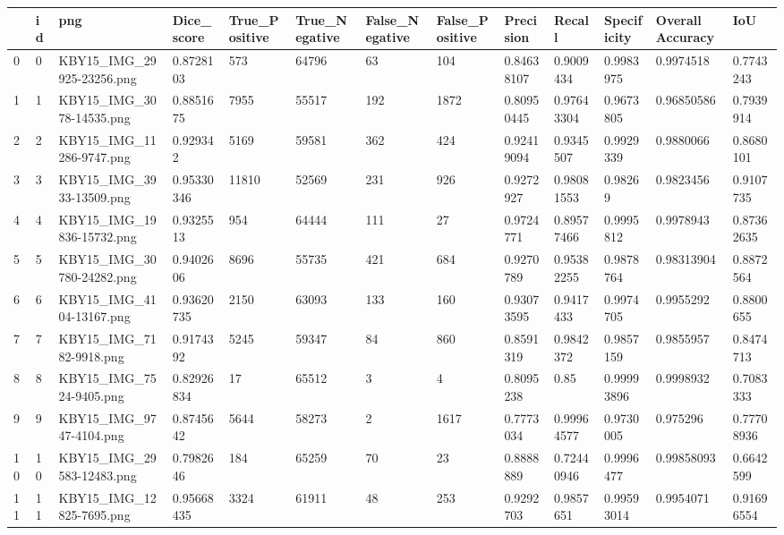 \documentclass[11pt, a4paper, twoside]{report}
\begin{document}
\begin{longtable}[c]{@{}lllllllllllll@{}}
\tiny
\toprule
 & id & png & Dice\_score & True\_Positive & True\_Negative & False\_Negative & False\_Positive & Precision & Recall & Specificity & Overall Accuracy & IoU \\* \midrule
\endhead
%
\bottomrule
\endfoot
%
\endlastfoot
%
0 & 0 & KBY15\_IMG\_29925-23256.png & 0.8728103 & 573 & 64796 & 63 & 104 & 0.84638107 & 0.9009434 & 0.9983975 & 0.9974518 & 0.7743243 \\
1 & 1 & KBY15\_IMG\_3078-14535.png & 0.8851675 & 7955 & 55517 & 192 & 1872 & 0.80950445 & 0.97643304 & 0.9673805 & 0.96850586 & 0.7939914 \\
2 & 2 & KBY15\_IMG\_11286-9747.png & 0.929342 & 5169 & 59581 & 362 & 424 & 0.92419094 & 0.9345507 & 0.9929339 & 0.9880066 & 0.8680101 \\
3 & 3 & KBY15\_IMG\_3933-13509.png & 0.95330346 & 11810 & 52569 & 231 & 926 & 0.9272927 & 0.98081553 & 0.98269 & 0.9823456 & 0.9107735 \\
4 & 4 & KBY15\_IMG\_19836-15732.png & 0.9325513 & 954 & 64444 & 111 & 27 & 0.9724771 & 0.89577466 & 0.9995812 & 0.9978943 & 0.87362635 \\
5 & 5 & KBY15\_IMG\_30780-24282.png & 0.9402606 & 8696 & 55735 & 421 & 684 & 0.9270789 & 0.95382255 & 0.9878764 & 0.98313904 & 0.8872564 \\
6 & 6 & KBY15\_IMG\_4104-13167.png & 0.93620735 & 2150 & 63093 & 133 & 160 & 0.93073595 & 0.9417433 & 0.9974705 & 0.9955292 & 0.8800655 \\
7 & 7 & KBY15\_IMG\_7182-9918.png & 0.9174392 & 5245 & 59347 & 84 & 860 & 0.8591319 & 0.9842372 & 0.9857159 & 0.9855957 & 0.8474713 \\
8 & 8 & KBY15\_IMG\_7524-9405.png & 0.82926834 & 17 & 65512 & 3 & 4 & 0.8095238 & 0.85 & 0.99993896 & 0.9998932 & 0.7083333 \\
9 & 9 & KBY15\_IMG\_9747-4104.png & 0.8745642 & 5644 & 58273 & 2 & 1617 & 0.7773034 & 0.99964577 & 0.9730005 & 0.975296 & 0.77708936 \\
10 & 10 & KBY15\_IMG\_29583-12483.png & 0.7982646 & 184 & 65259 & 70 & 23 & 0.8888889 & 0.72440946 & 0.9996477 & 0.99858093 & 0.6642599 \\
11 & 11 & KBY15\_IMG\_12825-7695.png & 0.95668435 & 3324 & 61911 & 48 & 253 & 0.9292703 & 0.9857651 & 0.99593014 & 0.9954071 & 0.91696554 \\

\end{longtable}
\end{document}
